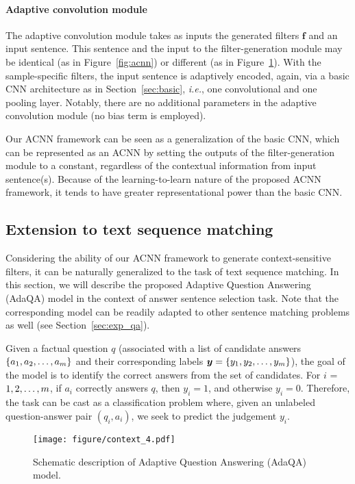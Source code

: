 \documentclass[11pt,a4paper]{article}
\begin{document}
\paragraph{Adaptive convolution module}
The adaptive convolution module takes as inputs the generated filters $\boldsymbol{f}$ and an input sentence. This sentence and the input to the filter-generation module may be identical (as in Figure~\ref{fig:acnn}) or different (as in Figure~\ref{fig:adaqa}). With the sample-specific filters, the input sentence is adaptively encoded, again, via a basic CNN architecture as in Section~\ref{sec:basic}, \emph{i.e.}, one convolutional and one pooling layer. Notably, there are no additional parameters in the adaptive convolution module (no bias term is employed).

Our ACNN framework can be seen as a generalization of the basic CNN, which can be represented as an ACNN by setting the outputs of the filter-generation module to a constant, regardless of the contextual information from input sentence(s). Because of the learning-to-learn \citep{thrun2012learning}
nature of the proposed ACNN framework, it tends to have greater representational power than the basic CNN.

\subsection{Extension to text sequence matching} \label{sec:adaqa} Considering the ability of our ACNN framework to generate context-sensitive filters, it can be naturally generalized to the task of text sequence matching. In this section, we will describe the proposed Adaptive Question Answering (AdaQA) model in the context of answer sentence selection task. Note that the corresponding model can be readily adapted to other sentence matching problems  as well (see Section~\ref{sec:exp_qa}). 

Given a factual question $q$ (associated with a list of candidate answers $\left\{  {a_1, a_2, \ldotp \ldotp \ldotp, a_m} \right\}$ and their corresponding labels $\boldsymbol{y}=\left\{  {y_1, y_2, \ldotp \ldotp \ldotp, y_m} \right\}$), the goal of the model is to identify the correct answers from the set of candidates. For $i$ = $1, 2, \ldotp \ldotp \ldotp, m $, if $a_i$ correctly answers $q$, then $y_i = 1$, and otherwise $y_i = 0$. Therefore, the task can be cast as a classification problem where, given an unlabeled question-answer pair $(q_i, a_i)$, we seek to predict the judgement $y_i$.

\begin{figure}[t!]
\centering
	\texttt{[image: figure/context\_4.pdf]}
	\vspace{-3mm}
	\caption{\small Schematic description of Adaptive Question Answering (AdaQA) model. }
	\label{fig:adaqa}
	\vspace{-3mm}
\end{figure}
\end{document}
